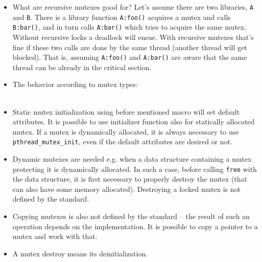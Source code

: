\begin{itemize}
\item What are recursive mutexes good for? Let's assume there are two
libraries, \texttt{A} and \texttt{B}. There is a library
function \texttt{A:foo()} acquires a mutex and calls \texttt{B:bar()},
and in turn calls \texttt{A:bar()} which tries to acquire the same
mutex.  Without recursive locks a deadlock will ensue.  With recursive mutexes
that's fine if these two calls are done by the same thread (another thread will
get blocked).  That is, assuming \texttt{A:foo()} and \texttt{A:bar()} are aware
that the same thread can be already in the critical section.
\item \label{MUTEXTAB} The behavior according to mutex types:\\
\\
\item Static mutex initialization using before mentioned macro will set default
attributes. It is possible to use initializer function also for statically
allocated mutex. If a mutex is dynamically allocated, it is always necessary to
use \texttt{pthread\_mutex\_init}, even if the default attributes are desired or
not.
\item Dynamic mutexes are needed e.g. when a data structure containing a mutex
protecting it is dynamically allocated.  In such a case, before calling
\texttt{free} with the data structure, it is first necessary to properly destroy
the mutex (that can also have some memory allocated).  Destroying a locked mutex
is not defined by the standard.
\item Copying mutexes is also not defined by the standard -- the result of such
an operation depends on the implementation.  It is possible to copy a pointer to
a mutex and work with that.
\item A mutex destroy means its deinitialization.
\end{itemize}


